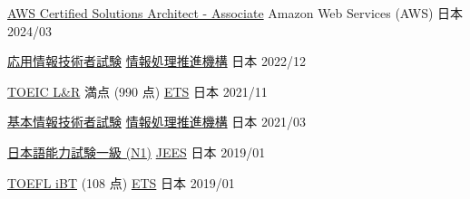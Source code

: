 
\begin{cvhonors}


  \cvhonor
  {\href{https://www.credly.com/badges/84c825b1-44c9-448f-9269-f0cb9fd1e15e/public_url}{AWS Certified Solutions Architect - Associate}} %
  {Amazon Web Services (AWS)} %
  {日本} %
  {2024/03} %

  \cvhonor
    {\href{https://www.ipa.go.jp/shiken/kubun/ap.html}{応用情報技術者試験}} %
    {\href{https://www.ipa.go.jp/index.html}{情報処理推進機構}} %
    {日本} %
    {2022/12} %

  \cvhonor
    {\href{https://www.iibc-global.org/toeic.html}{TOEIC L\&R} 満点 (990 点)} %
    {\href{https://www.ets.org/}{ETS}} %
    {日本} %
    {2021/11} %

  \cvhonor
    {\href{https://www.ipa.go.jp/shiken/kubun/fe.html}{基本情報技術者試験}} %
    {\href{https://www.ipa.go.jp/index.html}{情報処理推進機構}} %
    {日本} %
    {2021/03} %

  \cvhonor
    {\href{https://www.jlpt.jp/}{日本語能力試験一級 (N1)}} %
    {\href{http://www.jees.or.jp/}{JEES}} %
    {日本} %
    {2019/01} %

  \cvhonor
    {\href{https://www.ets.org/toefl.html}{TOEFL iBT} (108 点)} %
    {\href{https://www.ets.org/}{ETS}}%
    {日本} %
    {2019/01} %
\end{cvhonors}

